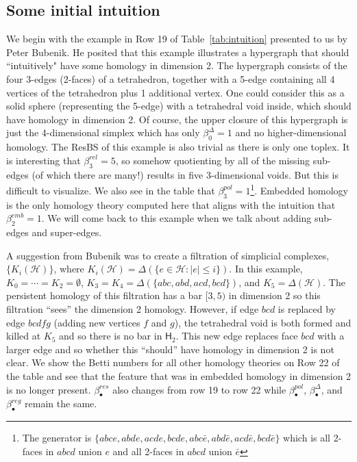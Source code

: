 \documentclass{amsart}
\newcommand{\Hgroup}	     {\mathsf{H}}
\renewcommand{\hom}[2]{\Hgroup_{#2}^{#1}}
\newcommand{\betti}[2]{\beta_{#2}^{#1}}
\renewcommand{\H}{\mathcal{H}}
\begin{document}
\subsection{Some initial intuition}
\label{sec:init_intuit}
We begin with the example in Row 19 of Table~\ref{tab:intuition} presented to us by Peter Bubenik. 
He posited that this example illustrates a hypergraph that should ``intuitively" have some homology in dimension 2. The hypergraph consists of the four 3-edges (2-faces) of a tetrahedron, together with a 5-edge containing all 4 vertices of the tetrahedron plus 1 additional vertex. One could consider this as a solid sphere (representing the 5-edge) with a tetrahedral void inside, which should have homology in dimension 2. Of course, the upper closure of this hypergraph is just the 4-dimensional simplex which has only $\betti{\Delta}{0}=1$ and no higher-dimensional homology. The ResBS of this example is also trivial as there is only one toplex. It is interesting that $\betti{rel}{3}=5$, so somehow quotienting by all of the missing sub-edges (of which there are many!) results in five 3-dimensional voids. But this is difficult to visualize. 
We also see in the table that $\betti{pol}{3}=1$\footnote{The generator is $\{abce, abde, acde, bcde, abc\bar{e}, abd\bar{e}, acd\bar{e}, bcd\bar{e}\}$ which is all 2-faces in $abcd$ union $e$ and all 2-faces in $abcd$ union $\bar{e}$}. 
Embedded homology is the only homology theory computed here that aligns with the intuition that $\betti{emb}{2}=1$.
We will come back to this example when we talk about adding sub-edges and super-edges. 

A suggestion from Bubenik was to create a filtration of simplicial complexes, $\{K_i(\H)\}$, where $K_i(\H) = \Delta(\{e \in \H : |e| \leq i\})$. In this example, $K_0 = \cdots = K_2 = \emptyset$, $K_3 = K_4 = \Delta(\{abc, abd, acd, bcd\})$, and $K_5 = \Delta(\H)$. The persistent homology of this filtration has a bar $[3,5)$ in dimension 2 so this filtration ``sees'' the dimension 2 homology. However, if edge $bcd$ is replaced by edge $bcdfg$ (adding new vertices $f$ and $g$), the tetrahedral void is both formed and killed at $K_5$ and so there is no bar in $\hom{}{2}$. This new edge replaces face $bcd$ with a larger edge and so whether this ``should'' have homology in dimension 2 is not clear. We show the Betti numbers for all other homology theories on Row 22 of the table and see that the feature that was in embedded homology in dimension 2 is no longer present. $\betti{res}{\bullet}$ also changes from row 19 to row 22 while $\betti{pol}{\bullet}$, $\betti{\Delta}{\bullet}$, and $\betti{reg}{\bullet}$ remain the same.
\end{document}
